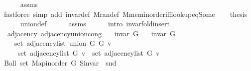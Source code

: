\begin{isabellebody}
\ \ \ \ \isamarkupfalse%
\ assms{\isacharparenleft}{\kern0pt}{}{\isacharparenright}{\kern0pt}\isanewline
\ \ \ \ \isamarkupfalse%
\ {\isacharparenleft}{\kern0pt}fastforce\ simp\ add{\isacharcolon}{\kern0pt}\ invar{\isacharunderscore}{\kern0pt}def\ M{\isachardot}{\kern0pt}ran{\isacharunderscore}{\kern0pt}def\ M{\isachardot}{\kern0pt}mem{\isacharunderscore}{\kern0pt}inorder{\isacharunderscore}{\kern0pt}iff{\isacharunderscore}{\kern0pt}lookup{\isacharunderscore}{\kern0pt}eq{\isacharunderscore}{\kern0pt}Some{\isacharparenright}{\kern0pt}\isanewline
\ \ \isamarkupfalse%
\ {\isacharquery}{\kern0pt}thesis\isanewline
\ \ \ \ \isamarkupfalse%
\ union{\isacharunderscore}{\kern0pt}def\isanewline
\ \ \ \ \isamarkupfalse%
\ assms{\isacharparenleft}{\kern0pt}{}{\isacharparenright}{\kern0pt}\isanewline
\ \ \ \ \isamarkupfalse%
\ {\isacharparenleft}{\kern0pt}intro\ invar{\isacharunderscore}{\kern0pt}fold{\isacharunderscore}{\kern0pt}insert{\isacharunderscore}{\kern0pt}{}{\isacharparenright}{\kern0pt}\isanewline
{}\isamarkupfalse%
%
\endisatagproof
{\isafoldproof}%
%
\isadelimproof
\isanewline
%
\endisadelimproof
\isanewline
{}\isamarkupfalse%
\ {\isacharparenleft}{\kern0pt}\ adjacency{\isacharparenright}{\kern0pt}\ adjacency{\isacharunderscore}{\kern0pt}union{\isacharunderscore}{\kern0pt}cong{\isacharcolon}{\kern0pt}\isanewline
\ \ \ {\isachardoublequoteopen}invar\ G{}{\isachardoublequoteclose}\isanewline
\ \ \ {\isachardoublequoteopen}invar\ G{}{\isachardoublequoteclose}\isanewline
\ \ \isanewline
\ \ \ \ {\isachardoublequoteopen}set\ {\isacharparenleft}{\kern0pt}adjacency{\isacharunderscore}{\kern0pt}list\ {\isacharparenleft}{\kern0pt}union\ G{}\ G{}{\isacharparenright}{\kern0pt}\ v{\isacharparenright}{\kern0pt}\ {\isacharequal}{\kern0pt}\isanewline
\ \ \ \ \ set\ {\isacharparenleft}{\kern0pt}adjacency{\isacharunderscore}{\kern0pt}list\ G{}\ v{\isacharparenright}{\kern0pt}\ {\isasymunion}\ set\ {\isacharparenleft}{\kern0pt}adjacency{\isacharunderscore}{\kern0pt}list\ G{}\ v{\isacharparenright}{\kern0pt}{\isachardoublequoteclose}\isanewline
%
\isadelimproof
%
\endisadelimproof
%
\isatagproof
{}\isamarkupfalse%
\ {\isacharminus}{\kern0pt}\isanewline
\ \ \isamarkupfalse%
\ {\isachardoublequoteopen}Ball\ {\isacharparenleft}{\kern0pt}set\ {\isacharparenleft}{\kern0pt}Map{\isacharunderscore}{\kern0pt}inorder\ G{}{\isacharparenright}{\kern0pt}{\isacharparenright}{\kern0pt}\ {\isacharparenleft}{\kern0pt}S{\isachardot}{\kern0pt}invar\ {\isasymcirc}\ snd{\isacharparenright}{\kern0pt}{\isachardoublequoteclose}\isanewline

\end{isabellebody}
